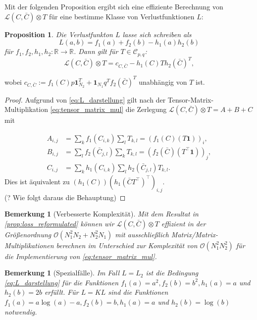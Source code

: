 \documentclass[11pt,a4paper]{article}
\newtheorem{proposition}[theorem]{Proposition}
\newtheorem{remark}[theorem]{Bemerkung}
\numberwithin{equation}{section}
\begin{document}
	Mit der folgenden Proposition ergibt sich eine effiziente Berechnung von $\mathcal{L} (C, \bar{C}) \otimes T$ für eine bestimme Klasse von Verlustfunktionen $L$:
	
	\begin{proposition}\label{prop:loss_reformulated}
		Die Verlustfunkton $L$ lasse sich schreiben als 
		\begin{equation}
		L(a,b) = f_1(a) + f_2(b) - h_1(a)h_2(b) \label{eq:L_darstellung}
		\end{equation}
		für $f_1, f_2,h_1, h_2:\mathbb{R} \to \mathbb{R}$. Dann gilt für $T \in \mathcal{C}_{p,q}$:
		\begin{equation}
		\mathcal{L} (C, \bar{C}) \otimes T = c_{C, \bar{C}} - h_1(C)Th_2(\bar{C})^T,
		\end{equation}
	\end{proposition} 
	wobei $c_{C, \bar{C}}:= f_1(C)p \boldsymbol{1}_{N_2}^T + \boldsymbol{1}_{N_1}q^Tf_2(\bar{C})^T$ unabhängig von $T$ ist.
	
	\begin{proof}
		Aufgrund von \autoref{eq:L_darstellung} gilt nach der Tensor-Matrix-Multiplikation \autoref{eq:tensor_matrix_mul}
		die Zerlegung $\mathcal{L} (C, \bar{C}) \otimes T = A + B + C$ mit
		
		\begin{align*}
		A_{i,j} &= \sum_k{f_1(C_{i,k})} \sum_l{T_{k,l}} = (f_1(C)(T\boldsymbol{1}))_i, \\
		B_{i,j} &= \sum_l{f_2(\bar{C}_{j,l})} \sum_k{T_{k,l}} = (f_2(\bar{C})(T^\top\boldsymbol{1}))_j,\\
		C_{i,j} &= \sum_k{h_1(C_{i,k})} \sum_l{h_2(\bar{C}_{j,l})T_{k,l}}.
		\end{align*}
		Dies ist äquivalent zu $(h_1(C))(h_1(\bar{C}T^\top)^\top)_{i,j}.$\\
		(? Wie folgt daraus die Behauptung)
	\end{proof}
	
	\begin{remark}[Verbesserte Komplexität]
		Mit dem Resultat in \autoref{prop:loss_reformulated} können wir $\mathcal{L} (C,\bar{C}) \otimes T$ effizient in der Größenordnung $\mathcal{O}(N_1^2N_2 + N_2^2N_1)$ mit ausschließlich Matrix/Matrix-Multiplikationen berechnen im Unterschied zur Komplexität von $\mathcal{O}(N_1^2N_2^2)$ für die Implementierung von \autoref{eq:tensor_matrix_mul}.
	\end{remark}
	
	\begin{remark}[Spezialfälle]
		Im Fall $L=L_2$ ist die Bedingung \autoref{eq:L_darstellung} für die Funktionen $f_1(a) = a^2, f_2(b) = b^2, h_1(a) = a$ und $h_2(b) = 2b$ erfüllt.
		Für $L=KL$ sind die Funktionen $f_1(a) = a \log (a) -a, f_2(b) = b, h_1(a) =a $ und $h_2(b) = \log (b)$ notwendig.
	\end{remark}
	
\end{document}
